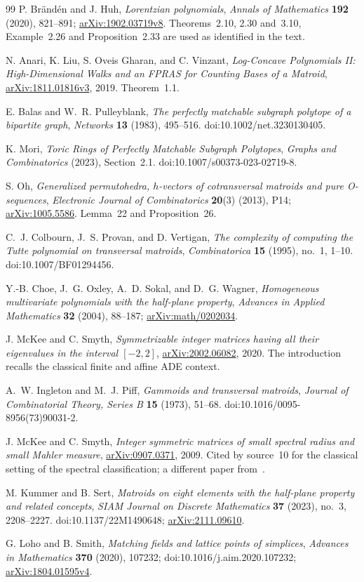 \documentclass[11pt]{article}
\numberwithin{equation}{section}
\theoremstyle{definition}
\newcommand{\arxiv}[1]{\href{https://arxiv.org/abs/#1}{arXiv:#1}}
\begin{document}
\begin{thebibliography}{99}
P. Br\"and\'en and J. Huh,
\emph{Lorentzian polynomials},
\emph{Annals of Mathematics} \textbf{192} (2020), 821--891;
\arxiv{1902.03719v8}. Theorems~2.10, 2.30 and~3.10, Example~2.26 and
Proposition~2.33 are used as identified in the text.

N. Anari, K. Liu, S. Oveis Gharan, and C. Vinzant,
\emph{Log-Concave Polynomials II: High-Dimensional Walks and an FPRAS for
Counting Bases of a Matroid}, \arxiv{1811.01816v3}, 2019.
Theorem~1.1.

E. Balas and W.~R. Pulleyblank,
\emph{The perfectly matchable subgraph polytope of a bipartite graph},
\emph{Networks} \textbf{13} (1983), 495--516.
doi:10.1002/net.3230130405.

K. Mori,
\emph{Toric Rings of Perfectly Matchable Subgraph Polytopes},
\emph{Graphs and Combinatorics} (2023), Section~2.1.
doi:10.1007/s00373-023-02719-8.

S. Oh,
\emph{Generalized permutohedra, $h$-vectors of cotransversal matroids and
pure O-sequences},
\emph{Electronic Journal of Combinatorics} \textbf{20}(3) (2013), P14;
\arxiv{1005.5586}. Lemma~22 and Proposition~26.

C.~J. Colbourn, J.~S. Provan, and D. Vertigan,
\emph{The complexity of computing the Tutte polynomial on transversal
matroids}, \emph{Combinatorica} \textbf{15} (1995), no.~1, 1--10.
doi:10.1007/BF01294456.

Y.-B. Choe, J.~G. Oxley, A.~D. Sokal, and D.~G. Wagner,
\emph{Homogeneous multivariate polynomials with the half-plane property},
\emph{Advances in Applied Mathematics} \textbf{32} (2004), 88--187;
\arxiv{math/0202034}.

J. McKee and C. Smyth,
\emph{Symmetrizable integer matrices having all their eigenvalues in the
interval $[-2,2]$}, \arxiv{2002.06082}, 2020.
The introduction recalls the classical finite and affine ADE context.

A.~W. Ingleton and M.~J. Piff,
\emph{Gammoids and transversal matroids},
\emph{Journal of Combinatorial Theory, Series B} \textbf{15} (1973), 51--68.
doi:10.1016/0095-8956(73)90031-2.

J. McKee and C. Smyth,
\emph{Integer symmetric matrices of small spectral radius and small Mahler
measure}, \arxiv{0907.0371}, 2009.
Cited by source~10 for the classical setting of the spectral
classification; a different paper from~\cite{McKeeSmyth}.

M. Kummer and B. Sert,
\emph{Matroids on eight elements with the half-plane property and related
concepts}, \emph{SIAM Journal on Discrete Mathematics} \textbf{37} (2023),
no.~3, 2208--2227. doi:10.1137/22M1490648; \arxiv{2111.09610}.

G. Loho and B. Smith,
\emph{Matching fields and lattice points of simplices},
\emph{Advances in Mathematics} \textbf{370} (2020), 107232;
doi:10.1016/j.aim.2020.107232; \arxiv{1804.01595v4}.

\end{thebibliography}
\end{document}
